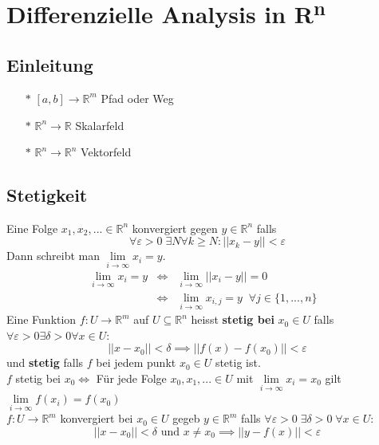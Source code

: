 \section{Differenzielle Analysis in R\textsuperscript{n}}
\subsection{Einleitung}
  \begin{itemize}
    \item[$*$] $[a,b]\rightarrow\mathbb R^m$ Pfad oder Weg
    \item[$*$] $\mathbb R^n\rightarrow\mathbb R$ Skalarfeld
    \item[$*$] $\mathbb R^n\rightarrow\mathbb R^n$ Vektorfeld
  \end{itemize}
\subsection{Stetigkeit}
    Eine Folge $x_1,x_2,...\in\mathbb R^n$ konvergiert gegen $y\in\mathbb R^n$
    falls 
    $$
      \forall\varepsilon>0\;\exists N\forall k\geq N: ||x_k-y||<\varepsilon
    $$
    Dann schreibt man $\lim\limits_{i\rightarrow\infty}x_i=y$.\\
    $$\begin{array}{lclr}
      \lim\limits_{i\rightarrow\infty}x_i=y&\iff&\lim\limits_{i\rightarrow\infty}||x_i-y||=0&\\
      &\iff&\lim\limits_{i\rightarrow\infty}x_{i,j}=y\;\;\forall j\in\{1,...,n\}
    \end{array}$$
    Eine Funktion $f:U\rightarrow \mathbb R^m$ auf $U\subseteq\mathbb R^n$
    heisst \textbf{stetig bei} $x_0\in U$ falls
    $\forall\varepsilon>0\exists\delta>0\forall x\in U:$
    $$||x-x_0||<\delta\implies||f(x)-f(x_0)||<\varepsilon$$
    und \textbf{stetig} falls $f$ bei jedem punkt $x_0\in U$ stetig ist.\\
    $f$ stetig bei $x_0\iff$ Für jede Folge $x_0,x_1,...\in U$ mit
    $\lim\limits_{i\rightarrow\infty}x_i=x_0$ gilt
    $\lim\limits_{i\rightarrow\infty}f(x_i)=f(x_0)$\\
    $f:U\rightarrow\mathbb R^m$ konvergiert bei $x_0\in U$ gegeb $y\in\mathbb
    R^m$ falls $\forall\varepsilon>0\;\exists\delta>0\;\forall x\in U:$
    $$
      ||x-x_0||<\delta \text{ und } x\neq x_0\implies ||y-f(x)||<\varepsilon
    $$
